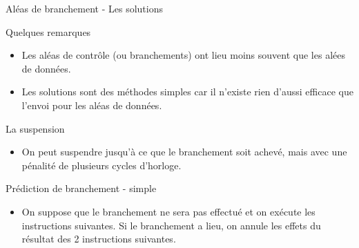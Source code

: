 %
\begin{Frame}{Aléas de branchement - Les solutions}

  \begin{block}{Quelques remarques}
       \begin{center}
 	\begin{itemize}
          \item Les aléas de contrôle (ou branchements) ont lieu moins souvent que les alées de données.
          \item Les solutions sont des méthodes simples car il n'existe rien d'aussi efficace que l'envoi pour les aléas de données. 
        \end{itemize}
       \end{center}
      \end{block}   

\begin{block}{La suspension}
       \begin{center}
 	\begin{itemize}
          \item On peut suspendre jusqu'à ce que le branchement soit achevé, mais avec une pénalité de plusieurs cycles d'horloge.
        \end{itemize}
       \end{center}
      \end{block}   
 
\begin{block}{Prédiction de branchement - simple}
       \begin{center}
 	\begin{itemize}
          \item On suppose que le branchement ne sera pas effectué et on exécute les instructions suivantes. Si le branchement a lieu, on annule les effets du résultat des 2 instructions suivantes.
        \end{itemize}
       \end{center}
      \end{block}  


\end{Frame}


